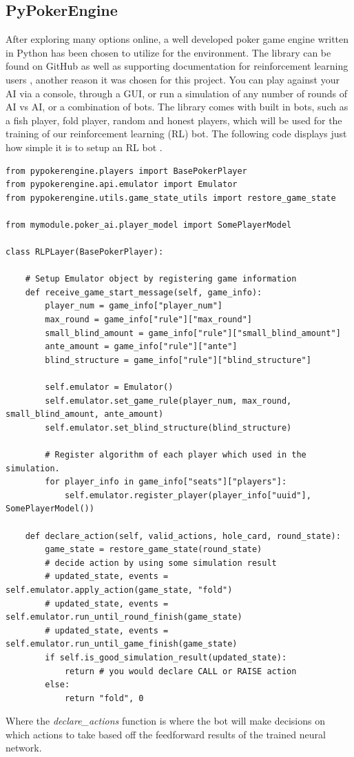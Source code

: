 \documentclass[12pt]{article}
\begin{document}
\subsection{PyPokerEngine}
After exploring many options online, a well developed poker game engine written in Python has been chosen to utilize for the environment. The library can be found on GitHub \cite{pokergit} as well as supporting documentation for reinforcement learning users \cite{pokerdoc}, another reason it was chosen for this project. You can play against your AI via a console, through a GUI, or run a simulation of any number of rounds of AI vs AI, or a combination of bots. The library comes with built in bots, such as a fish player, fold player, random and honest players, which will be used for the training of our reinforcement learning (RL) bot. The following code displays just how simple it is to setup an RL bot \cite{pokergit}.
\begin{verbatim}
from pypokerengine.players import BasePokerPlayer
from pypokerengine.api.emulator import Emulator
from pypokerengine.utils.game_state_utils import restore_game_state

from mymodule.poker_ai.player_model import SomePlayerModel

class RLPLayer(BasePokerPlayer):

    # Setup Emulator object by registering game information
    def receive_game_start_message(self, game_info):
        player_num = game_info["player_num"]
        max_round = game_info["rule"]["max_round"]
        small_blind_amount = game_info["rule"]["small_blind_amount"]
        ante_amount = game_info["rule"]["ante"]
        blind_structure = game_info["rule"]["blind_structure"]
        
        self.emulator = Emulator()
        self.emulator.set_game_rule(player_num, max_round, small_blind_amount, ante_amount)
        self.emulator.set_blind_structure(blind_structure)
        
        # Register algorithm of each player which used in the simulation.
        for player_info in game_info["seats"]["players"]:
            self.emulator.register_player(player_info["uuid"], SomePlayerModel())

    def declare_action(self, valid_actions, hole_card, round_state):
        game_state = restore_game_state(round_state)
        # decide action by using some simulation result
        # updated_state, events = self.emulator.apply_action(game_state, "fold")
        # updated_state, events = self.emulator.run_until_round_finish(game_state)
        # updated_state, events = self.emulator.run_until_game_finish(game_state)
        if self.is_good_simulation_result(updated_state):
            return # you would declare CALL or RAISE action
        else:
            return "fold", 0
\end{verbatim}
Where the \textit{declare\_actions} function is where the bot will make decisions on which actions to take based off the feedforward results of the trained neural network.
\end{document}
